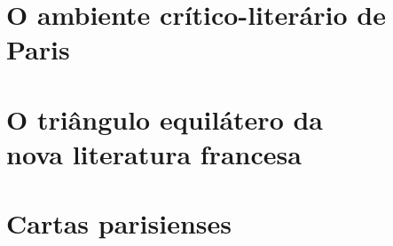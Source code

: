 

\part{O ambiente crítico-literário de Paris}




\part[O triângulo equilátero da nova\vspace*{-.2cm}\\ literatura francesa]{O triângulo equilátero da\\ nova literatura francesa}









\part{Cartas parisienses}

